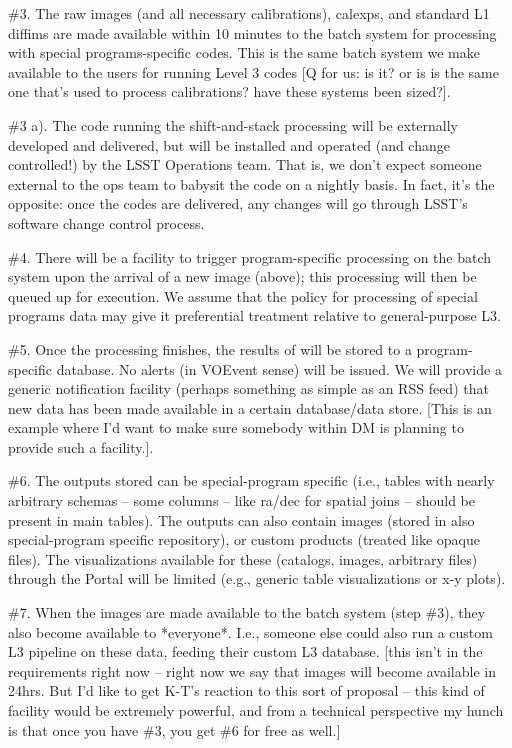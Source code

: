\documentclass[DM,lsstdraft,toc]{lsstdoc}
\begin{document}
\#3. The raw images (and all necessary calibrations), calexps, and standard L1 diffims are made available within 10 minutes to the batch system for processing with special programs-specific codes. This is the same batch system we make available to the users for running Level 3 codes [Q for us: is it? or is is the same one that's used to process calibrations? have these systems been sized?]. 

\#3 a). The code running the shift-and-stack processing will be externally developed and delivered, but will be installed and operated (and change controlled!) by the LSST Operations team. That is, we don't expect someone external to the ops team to babysit the code on a nightly basis. In fact, it's the opposite: once the codes are delivered, any changes will go through LSST's software change control process.

\#4. There will be a facility to trigger program-specific processing on the batch system upon the arrival of a new image (above); this processing will then be queued up for execution. We assume that the policy for processing of special programs data may give it preferential treatment relative to general-purpose L3. 

\#5. Once the processing finishes, the results of will be stored to a program-specific database. No alerts (in VOEvent sense) will be issued. We will provide a generic notification facility (perhaps something as simple as an RSS feed) that new data has been made available in a certain database/data store. [This is an example where I'd want to make sure somebody within DM is planning to provide such a facility.].

\#6. The outputs stored can be special-program specific (i.e., tables with nearly arbitrary schemas -- some columns -- like ra/dec for spatial joins -- should be present in main tables). The outputs can also contain images (stored in also special-program specific repository), or custom products (treated like opaque files). The visualizations available for these (catalogs, images, arbitrary files) through the Portal will be limited (e.g., generic table visualizations or x-y plots).

\#7. When the images are made available to the batch system (step \#3), they also become available to *everyone*. I.e., someone else could also run a custom L3 pipeline on these data, feeding their custom L3 database. [this isn't in the requirements right now -- right now we say that images will become available in 24hrs. But I'd like to get K-T's reaction to this sort of proposal -- this kind of facility would be extremely powerful, and from a technical perspective my hunch is that once you have \#3, you get \#6 for free as well.]

\clearpage

\end{document}
